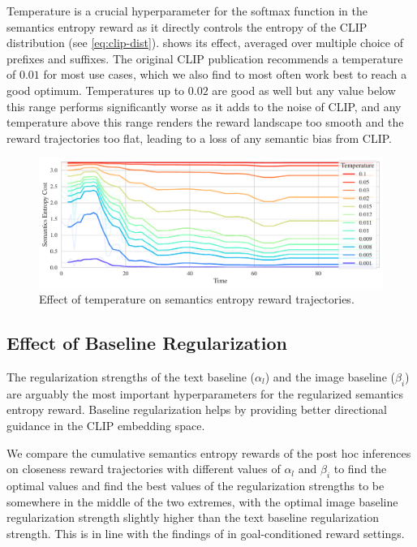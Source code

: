Temperature is a crucial hyperparameter for the softmax function in the semantics entropy reward as it directly controls the entropy of the CLIP distribution (see \eqref{eq:clip-dist}).
 shows its effect, averaged over multiple choice of prefixes and suffixes.
The original CLIP publication recommends a temperature of \(0.01\) for most use cases, which we also find to most often work best to reach a good optimum.
Temperatures up to \(0.02\) are good as well but any value below this range performs significantly worse as it adds to the noise of CLIP, and any temperature above this range renders the reward landscape too smooth and the reward trajectories too flat, leading to a loss of any semantic bias from CLIP.

\begin{figure}[H]
    \centering
    \includegraphics[width=\textwidth]{images/temperature_comparison.pdf}
    \caption{Effect of temperature on semantics entropy reward trajectories.}
    \label{fig:clip-temperature}    
\end{figure}

\subsection{Effect of Baseline Regularization}
\label{sec:reg-alpha-beta}

The regularization strengths of the text baseline (\(\alpha_{l}\)) and the image baseline (\(\beta_{i}\)) are arguably the most important hyperparameters for the regularized semantics entropy reward.
Baseline regularization helps by providing better directional guidance in the CLIP embedding space.

We compare the cumulative semantics entropy rewards of the post hoc inferences on closeness reward trajectories with different values of \(\alpha_{l}\) and \(\beta_{i}\) to find the optimal values and find the best values of the regularization strengths to be somewhere in the middle of the two extremes, with the optimal image baseline regularization strength slightly higher than the text baseline regularization strength.
This is in line with the findings of \cite{vlmrm} in goal-conditioned reward settings.

